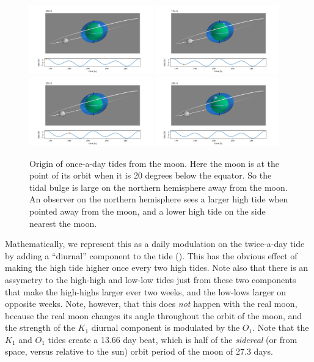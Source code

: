 \begin{figure}[hbtp]
  \begin{center}
    \includegraphics[width=2.1in,trim=40 20 50 20,clip]{figs/Waves/SideLow/frame1680}
    \includegraphics[width=2.1in,trim=40 20 50 20,clip]{figs/Waves/SideLow/frame1740}
    \includegraphics[width=2.1in,trim=40 20 50 20,clip]{figs/Waves/SideLow/frame1800}
    \includegraphics[width=2.1in,trim=40 20 50 20,clip]{figs/Waves/SideLow/frame1860}
    \caption{Origin of once-a-day tides from the moon. Here the moon is at the point of its orbit when it is 20 degrees below the equator.  So the tidal bulge is large on the northern hemisphere away from the moon.  An observer on the northern hemisphere sees a larger high tide when pointed away from the moon, and a lower high tide on the side nearest the moon. }
    \label{fig:SideLow}
  \end{center}
\end{figure}

Mathematically, we represent this as a daily modulation on the twice-a-day tide by adding a ``diurnal'' component to the tide ().  This has the obvious effect of making the high tide higher once every two high tides.  Note also that there is an assymetry to the high-high and low-low tides just from these two components that make the high-highs larger ever two weeks, and the low-lows larger on opposite weeks.  Note, however, that this does \emph{not} happen with the real moon, because the real moon changes its angle throughout the orbit of the moon, and the strength of the $K_1$ diurnal component is modulated by the $O_1$.  Note that the $K_1$ and $O_1$ tides create a 13.66 day beat, which is half of the \emph{sidereal} (or from space, versus relative to the sun) orbit period of the moon of 27.3 days.  
 
